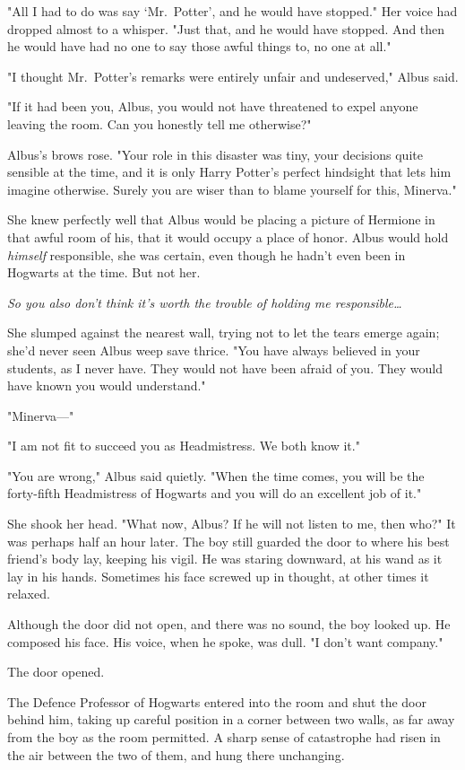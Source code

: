 "All I had to do was say `Mr.~Potter', and he would have stopped." Her voice
had dropped almost to a whisper. "Just that, and he would have stopped. And
then he would have had no one to say those awful things to, no one at all."

"I thought Mr.~Potter's remarks were entirely unfair and undeserved," Albus
said.

"If it had been you, Albus, you would not have threatened to expel anyone
leaving the room. Can you honestly tell me otherwise?"

Albus's brows rose. "Your role in this disaster was tiny, your decisions quite
sensible at the time, and it is only Harry Potter's perfect hindsight that lets
him imagine otherwise. Surely you are wiser than to blame yourself for this,
Minerva."

She knew perfectly well that Albus would be placing a picture of Hermione in
that awful room of his, that it would occupy a place of honor. Albus would hold
\emph{himself} responsible, she was certain, even though he hadn't even been in
Hogwarts at the time. But not her.

\emph{So you also don't think it's worth the trouble of holding me
responsible{\ldots}}

She slumped against the nearest wall, trying not to let the tears emerge again;
she'd never seen Albus weep save thrice. "You have always believed in your
students, as I never have. They would not have been afraid of you. They would
have known you would understand."

"Minerva---"

"I am not fit to succeed you as Headmistress. We both know it."

"You are wrong," Albus said quietly. "When the time comes, you will be the
forty-fifth Headmistress of Hogwarts and you will do an excellent job of it."

She shook her head. "What now, Albus? If he will not listen to me, then who?"
\later
It was perhaps half an hour later. The boy still guarded the door to where his
best friend's body lay, keeping his vigil. He was staring downward, at his wand
as it lay in his hands. Sometimes his face screwed up in thought, at other
times it relaxed.

Although the door did not open, and there was no sound, the boy looked up. He
composed his face. His voice, when he spoke, was dull. "I don't want company."

The door opened.

The Defence Professor of Hogwarts entered into the room and shut the door
behind him, taking up careful position in a corner between two walls, as far
away from the boy as the room permitted. A sharp sense of catastrophe had risen
in the air between the two of them, and hung there unchanging.

